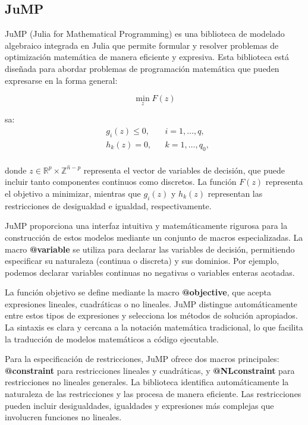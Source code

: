 \subsection*{JuMP}
JuMP (Julia for Mathematical Programming) es una biblioteca de modelado algebraico integrada en Julia que permite formular y resolver problemas de optimización matemática de manera eficiente y expresiva. Esta biblioteca está diseñada para abordar problemas de programación matemática que pueden expresarse en la forma general:

\begin{equation}
\min_{z} F(z)
\end{equation}

sa:
\begin{equation}
\begin{aligned}
    & g_i(z) \leq 0, && i = 1,\ldots,q,  \\
    & h_k(z)  = 0, && k = 1,\ldots,q_0,\\
\end{aligned}
\end{equation}

donde \(z \in \mathbb{R}^p \times \mathbb{Z}^{\hat{n}-p}\) representa el vector de variables de decisión, que puede incluir tanto componentes continuos como discretos. La función \(F(z)\) representa el objetivo a minimizar, mientras que \(g_i(z)\) y \(h_k(z)\) representan las restricciones de desigualdad e igualdad, respectivamente.

JuMP proporciona una interfaz intuitiva y matemáticamente rigurosa para la construcción de estos modelos mediante un conjunto de macros especializadas. La macro \textbf{@variable} se utiliza para declarar las variables de decisión, permitiendo especificar su naturaleza (continua o discreta) y sus dominios. Por ejemplo, podemos declarar variables continuas no negativas o variables enteras acotadas.

La función objetivo se define mediante la macro \textbf{@objective}, que acepta expresiones lineales, cuadráticas o no lineales. JuMP distingue automáticamente entre estos tipos de expresiones y selecciona los métodos de solución apropiados. La sintaxis es clara y cercana a la notación matemática tradicional, lo que facilita la traducción de modelos matemáticos a código ejecutable.

Para la especificación de restricciones, JuMP ofrece dos macros principales: \textbf{@constraint} para restricciones lineales y cuadráticas, y \textbf{@NLconstraint} para restricciones no lineales generales. La biblioteca identifica automáticamente la naturaleza de las restricciones y las procesa de manera eficiente. Las restricciones pueden incluir desigualdades, igualdades y expresiones más complejas que involucren funciones no lineales.

